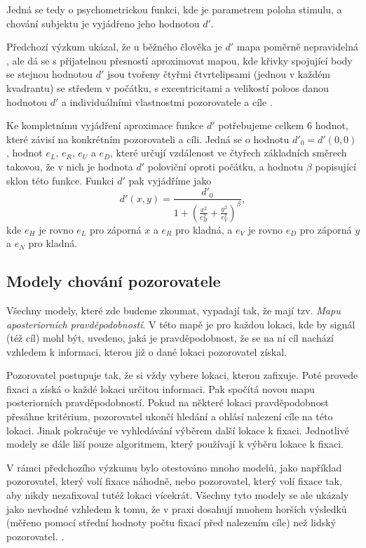 Jedná se tedy o psychometrickou funkci, kde je parametrem poloha stimulu, a chování subjektu je vyjádřeno jeho hodnotou
$d'$.

Předchozí výzkum ukázal, že u běžného člověka je $d'$ mapa poměrně
nepravidelná \citep{Najemnik08}, ale dá se s přijatelnou přesností aproximovat mapou, kde křivky
spojující body se stejnou hodnotou $d'$ jsou tvořeny čtyřmi čtvrt\-elipsami
(jednou v každém kvadrantu) se středem v počátku, s
excentricitami a velikostí poloos danou hodnotou $d'$ a individuálními
vlastnostmi pozorovatele a cíle \citep{Ellipse}. 

Ke kompletnímu vyjádření aproximace funkce $d'$ potřebujeme celkem 6 hodnot,
které závisí na konkrétním pozorovateli a cíli. Jedná se o hodnotu $d'_0 =
d'(0,0)$, hodnot $e_L$, $e_R$, $e_U$ a $e_D$, které určují vzdálenost ve čtyřech
základních směrech takovou, že v nich je hodnota $d'$ poloviční oproti počátku,
a hodnotu $\beta$ popisující sklon této funkce. Funkci $d'$ pak vyjádříme jako
$$ d'(x,y) = \frac{d'_0}{1+\left(\frac{x^2}{e_H^2}+\frac{y^2}{e_V^2}
\right)^\beta}, $$ kde $e_H$ je rovno $e_L$ pro záporná $x$ a $e_R$ pro kladná,
a $e_V$ je rovno $e_D$ pro záporná $y$ a $e_N$ pro kladná.


\subsection{Modely chování pozorovatele}

Všechny modely, které zde budeme zkoumat, vypadají tak, že mají tzv. {\it Mapu
aposteriorních pravděpodobností}. V této mapě je pro každou lokaci, kde by
signál (též cíl) mohl být, uvedeno, jaká je pravděpodobnost, že se na ní cíl
nachází vzhledem k informaci, kterou již o dané lokaci pozorovatel získal. 

Pozorovatel postupuje tak, že si vždy vybere lokaci, kterou zafixuje. Poté
provede fixaci a získá o každé lokaci určitou informaci. Pak spočítá novou mapu
posteriorních pravděpodobností. Pokud na některé lokaci pravděpodobnost přesáhne kritérium, pozorovatel
ukončí hledání a ohlásí nalezení cíle na této lokaci. Jinak pokračuje ve vyhledávání výběrem další lokace k fixaci.
Jednotlivé modely se dále liší pouze algoritmem, který používají k výběru lokace k fixaci.


V rámci předchozího výzkumu bylo otestováno mnoho modelů, jako například
pozorovatel, který volí fixace náhodně, nebo pozorovatel, který volí fixace 
tak, aby nikdy nezafixoval tutéž lokaci vícekrát. Všechny tyto modely se ale ukázaly jako
nevhodné vzhledem k tomu, že v praxi dosahují mnohem horších výsledků (měřeno
pomocí střední hodnoty počtu fixací před nalezením cíle) než lidský
pozorovatel. \citep{Najemnik05}.

